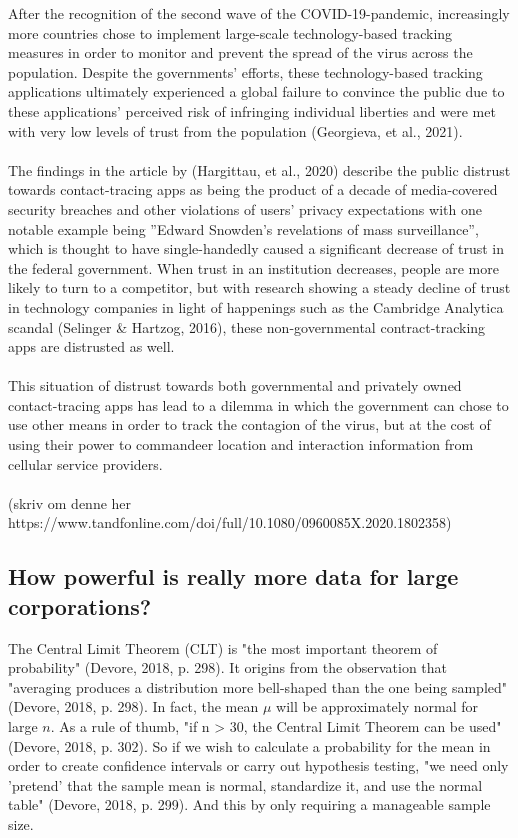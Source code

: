 \documentclass[11pt]{article}
\begin{document}
After the recognition of the second wave of the COVID-19-pandemic, increasingly more countries chose to implement large-scale technology-based tracking measures in order to monitor and prevent the spread of the virus across the population. Despite the governments’ efforts, these technology-based tracking applications ultimately experienced a global failure to convince the public due to these applications’ perceived risk of infringing individual liberties and were met with very low levels of trust from the population (Georgieva, et al., 2021).  \\ \\

The findings in the article by (Hargittau, et al., 2020) describe the public distrust towards contact-tracing apps as being the product of a decade of media-covered security breaches and other violations of users’ privacy expectations with one notable example being ”Edward Snowden’s revelations of mass surveillance”, which is thought to have single-handedly caused a significant decrease of trust in the federal government. When trust in an institution decreases, people are more likely to turn to a competitor, but with research showing a steady decline of trust in technology companies in light of happenings such as the Cambridge Analytica scandal (Selinger \& Hartzog, 2016), these non-governmental contract-tracking apps are distrusted as well. \\ \\

 

This situation of distrust towards both governmental and privately owned contact-tracing apps has lead to a dilemma in which the government can chose to use other means in order to track the contagion of the virus, but at the cost of using their power to commandeer location and interaction information from cellular service providers. \\ \\

(skriv om denne her https://www.tandfonline.com/doi/full/10.1080/0960085X.2020.1802358) 

\subsection{How powerful is really more data for large corporations?}
The Central Limit Theorem (CLT) is "the most important theorem of probability" (Devore, 2018, p. 298). It origins from the observation that "averaging produces a distribution more bell-shaped than the one being sampled" (Devore, 2018, p. 298). In fact, the mean $\mu$ will be approximately normal for large $n$. As a rule of thumb, "if n > 30, the Central Limit Theorem can be used" (Devore, 2018, p. 302). So if we wish to calculate a probability for the mean in order to create confidence intervals or carry out hypothesis testing, "we need only 'pretend' that the sample mean is normal, standardize it, and use the normal table" (Devore, 2018, p. 299). And this by only requiring a manageable sample size. \\ \\
\end{document}

